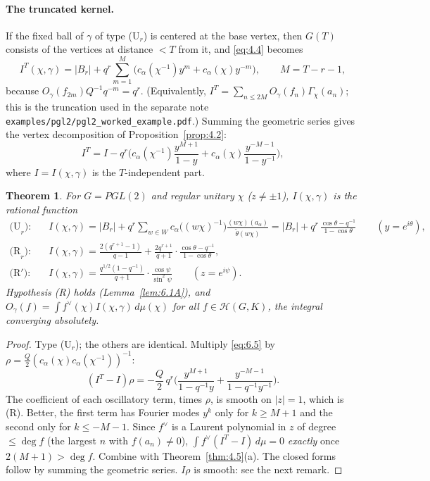 \documentclass[12pt,letterpaper]{article}
\numberwithin{equation}{section}
\theoremstyle{plain}
\newtheorem{theorem}[lemma]{Theorem}
\theoremstyle{remark}
\theoremstyle{plain}
\theoremstyle{definition}
\theoremstyle{remark}
\theoremstyle{remark}
\newcommand{\Hc}{\mathcal{H}}
\begin{document}
\paragraph{The truncated kernel.} If the fixed ball of $\gamma$ of type (U$_r$) is centered at the base vertex, then $G(T)$ consists of the vertices at distance $<T$ from it, and \eqref{eq:4.4} becomes
\begin{equation}\label{eq:6.4}
I^T(\chi,\gamma)=|B_r|+q^r\sum_{m=1}^{M}\big(c_\alpha(\chi^{-1})y^m+c_\alpha(\chi)y^{-m}\big),\qquad M=T-r-1,
\end{equation}
because $O_\gamma(f_{2m})Q^{-1}q^{-m}=q^r$. (Equivalently, $I^T=\sum_{n\le2M}O_\gamma(f_n)\Gamma_\chi(a_n)$; this is the truncation used in the separate note \texttt{examples/pgl2/pgl2\_worked\_example.pdf}.) Summing the geometric series gives the vertex decomposition of Proposition~\ref{prop:4.2}:
\begin{equation}\label{eq:6.5}
I^T=I-q^r\Big(c_\alpha(\chi^{-1})\frac{y^{M+1}}{1-y}+c_\alpha(\chi)\frac{y^{-M-1}}{1-y^{-1}}\Big),
\end{equation}
where $I=I(\chi,\gamma)$ is the $T$-independent part.

\begin{theorem}\label{thm:6.1}
For $G=PGL(2)$ and regular unitary $\chi$ ($z\ne\pm1$), $I(\chi,\gamma)$ is the rational function
\begin{align*}
\text{(U}_r\text{):}&\quad I(\chi,\gamma)=|B_r|+q^{r}\sum_{w\in W}c_\alpha\big((w\chi)^{-1}\big)\frac{(w\chi)(a_\alpha)}{\tilde\theta(w\chi)}=|B_r|+q^{r}\,\frac{\cos\theta-q^{-1}}{1-\cos\theta}\qquad(y=e^{i\theta}),\\
\text{(R}_r\text{):}&\quad I(\chi,\gamma)=\frac{2(q^{r+1}-1)}{q-1}+\frac{2q^{r+1}}{q+1}\cdot\frac{\cos\theta-q^{-1}}{1-\cos\theta},\\
\text{(R}'\text{):}&\quad I(\chi,\gamma)=\frac{q^{1/2}(1-q^{-1})}{q+1}\cdot\frac{\cos\psi}{\sin^2\psi}\qquad(z=e^{i\psi}).
\end{align*}
Hypothesis (R) holds (Lemma~\ref{lem:6.1A}), and $O_\gamma(f)=\int f^\vee(\chi)I(\chi,\gamma)\,d\mu(\chi)$ for all $f\in\Hc(G,K)$, the integral converging absolutely.
\end{theorem}

\begin{proof}
Type (U$_r$); the others are identical. Multiply \eqref{eq:6.5} by $\rho=\frac Q2(c_\alpha(\chi)c_\alpha(\chi^{-1}))^{-1}$:
\[
(I^T-I)\rho=-\frac Q2\,q^r\Big(\frac{y^{M+1}}{1-q^{-1}y}+\frac{y^{-M-1}}{1-q^{-1}y^{-1}}\Big).
\]
The coefficient of each oscillatory term, times $\rho$, is smooth on $|z|=1$, which is (R). Better, the first term has Fourier modes $y^k$ only for $k\ge M+1$ and the second only for $k\le-M-1$. Since $f^\vee$ is a Laurent polynomial in $z$ of degree $\le\deg f$ (the largest $n$ with $f(a_n)\ne0$), $\int f^\vee(I^T-I)\,d\mu=0$ \emph{exactly} once $2(M+1)>\deg f$. Combine with Theorem~\ref{thm:4.5}(a). The closed forms follow by summing the geometric series. $I\rho$ is smooth: see the next remark.
\end{proof}
\end{document}
